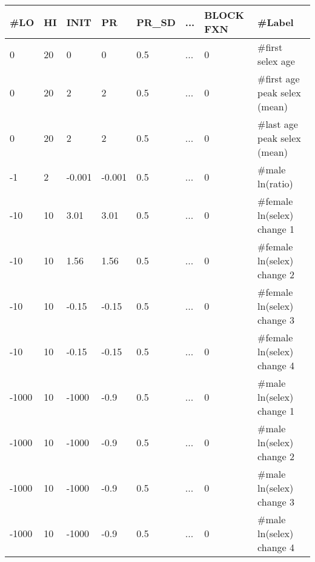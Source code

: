 \begin{description}
	\begin{center}
		\begin{longtable}{p{0.8cm} p{0.8cm} p{1cm} p{0.8cm} p{1.75cm}p{1cm} p{1.2cm} p{5.2cm}}
			\hline
			\#LO & HI & INIT & PR & PR\_SD  & ... & BLOCK FXN & \#Label \\
			\hline
			0 & 20 &  0 &  0 & 0.5  & ... & 0 & \#first selex age \\
			0 & 20 &  2 &  2 & 0.5  & ... & 0 & \#first age peak selex (mean) \\
			0 & 20 &  2 &  2 & 0.5  & ... & 0 & \#last age peak selex (mean) \\
		   -1 & 2 & -0.001 & -0.001 & 0.5  & ... & 0 & \#male ln(ratio) \\
		   -10 & 10 &  3.01 &  3.01 & 0.5  & ... & 0 & \#female ln(selex) change 1\\
		   -10 & 10 &  1.56 &  1.56 & 0.5  & ... & 0 & \#female ln(selex) change 2\\
		   -10 & 10 & -0.15 & -0.15 & 0.5  & ... & 0 & \#female ln(selex) change 3\\
		   -10 & 10 & -0.15 & -0.15 & 0.5  & ... & 0 & \#female ln(selex) change 4\\
		   -1000 & 10 & -1000 & -0.9 & 0.5  & ... & 0 & \#male ln(selex) change 1\\
		   -1000 & 10 & -1000 & -0.9 & 0.5  & ... & 0 & \#male ln(selex) change 2\\
		   -1000 & 10 & -1000 & -0.9 & 0.5  & ... & 0 & \#male ln(selex) change 3\\
		   -1000 & 10 & -1000 & -0.9 & 0.5  & ... & 0 & \#male ln(selex) change 4\\
			\hline
		\end{longtable}
	\end{center}		
\end{description}

